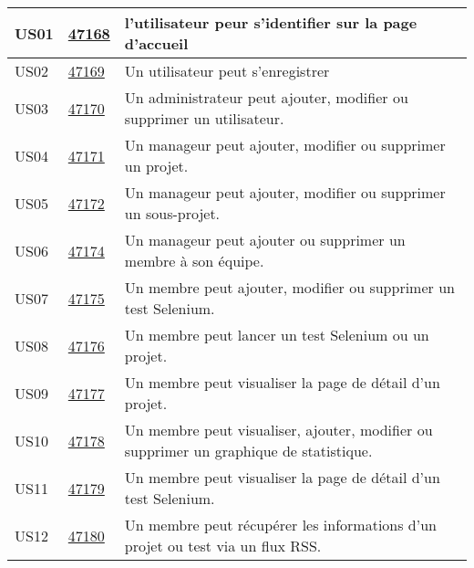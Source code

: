 \begin{center}
    \begin{tabular}{|l|p{1.5cm}|p{14cm}|}
        \hline
US01	&	\href{https://redmine-projets.smile.fr/issues/47168}{47168}	&	l'utilisateur peur s'identifier sur la page d'accueil	                                        \\
        \hline
US02	&	\href{https://redmine-projets.smile.fr/issues/47169}{47169}	&	Un utilisateur peut s'enregistrer	                                                            \\
        \hline
US03	&	\href{https://redmine-projets.smile.fr/issues/47170}{47170}	&	Un administrateur peut ajouter, modifier ou supprimer un utilisateur.	                        \\
        \hline
US04	&	\href{https://redmine-projets.smile.fr/issues/47171}{47171}	&	Un manageur peut ajouter, modifier ou supprimer un projet.	                                    \\
        \hline
US05	&	\href{https://redmine-projets.smile.fr/issues/47172}{47172}	&	Un manageur peut ajouter, modifier ou supprimer un sous-projet.	                                \\
        \hline
US06	&	\href{https://redmine-projets.smile.fr/issues/47174}{47174}	&	Un manageur peut ajouter ou supprimer un membre à son équipe.	                                \\
        \hline
US07	&	\href{https://redmine-projets.smile.fr/issues/47175}{47175}	&	Un membre peut ajouter, modifier ou supprimer un test Selenium.	                                \\
        \hline
US08	&	\href{https://redmine-projets.smile.fr/issues/47176}{47176}	&	Un membre peut lancer un test Selenium ou un projet.	                                        \\
        \hline
US09	&	\href{https://redmine-projets.smile.fr/issues/47177}{47177}	&	Un membre peut visualiser la page de détail d'un projet.	                                    \\
        \hline
US10	&	\href{https://redmine-projets.smile.fr/issues/47178}{47178}	&	Un membre peut visualiser, ajouter, modifier ou supprimer un graphique de statistique.	        \\
        \hline
US11	&	\href{https://redmine-projets.smile.fr/issues/47179}{47179}	&	Un membre peut visualiser la page de détail d'un test Selenium.	                                \\
        \hline
US12	&	\href{https://redmine-projets.smile.fr/issues/47180}{47180}	&	Un membre peut récupérer les informations d'un projet ou test via un flux RSS.	                \\

\end{tabular}
\end{center}
